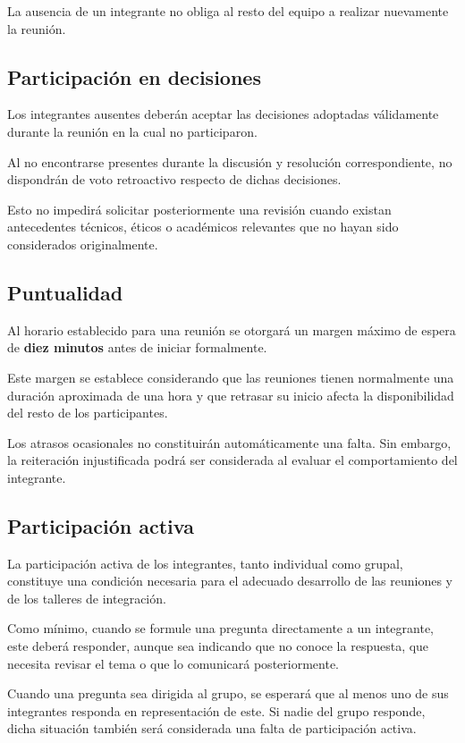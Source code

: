 \documentclass[12pt,a4paper]{article}
\begin{document}
La ausencia de un integrante no obliga al resto del equipo a realizar nuevamente la reunión.

\subsection{Participación en decisiones}

Los integrantes ausentes deberán aceptar las decisiones adoptadas válidamente durante la reunión en la cual no participaron.

Al no encontrarse presentes durante la discusión y resolución correspondiente, no dispondrán de voto retroactivo respecto de dichas decisiones.

Esto no impedirá solicitar posteriormente una revisión cuando existan antecedentes técnicos, éticos o académicos relevantes que no hayan sido considerados originalmente.

\subsection{Puntualidad}

Al horario establecido para una reunión se otorgará un margen máximo de espera de \textbf{diez minutos} antes de iniciar formalmente.

Este margen se establece considerando que las reuniones tienen normalmente una duración aproximada de una hora y que retrasar su inicio afecta la disponibilidad del resto de los participantes.

Los atrasos ocasionales no constituirán automáticamente una falta. Sin embargo, la reiteración injustificada podrá ser considerada al evaluar el comportamiento del integrante.

\subsection{Participación activa}

La participación activa de los integrantes, tanto individual como grupal, constituye una condición necesaria para el adecuado desarrollo de las reuniones y de los talleres de integración.

Como mínimo, cuando se formule una pregunta directamente a un integrante, este deberá responder, aunque sea indicando que no conoce la respuesta, que necesita revisar el tema o que lo comunicará posteriormente.

Cuando una pregunta sea dirigida al grupo, se esperará que al menos uno de sus integrantes responda en representación de este. Si nadie del grupo responde, dicha situación también será considerada una falta de participación activa.
\end{document}
